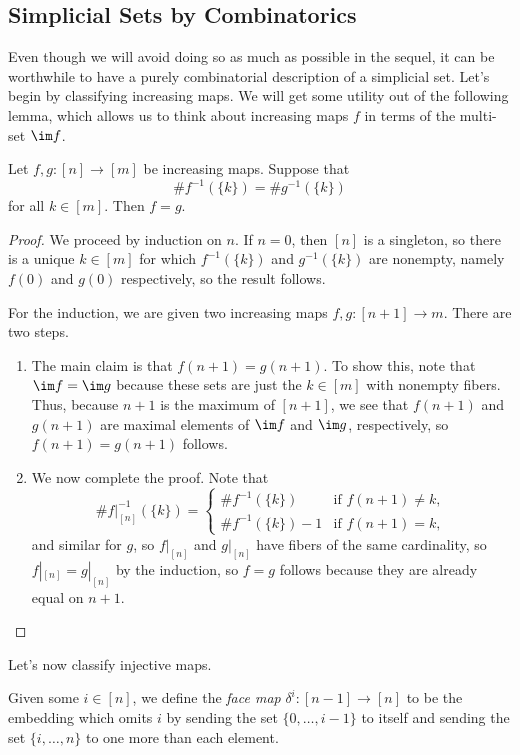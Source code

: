 \documentclass[../notes.tex]{subfiles}
\begin{document}
\subsection{Simplicial Sets by Combinatorics}
Even though we will avoid doing so as much as possible in the sequel, it can be worthwhile to have a purely combinatorial description of a simplicial set. Let's begin by classifying increasing maps. We will get some utility out of the following lemma, which allows us to think about increasing maps $f$ in terms of the multi-set $\im f$.
\begin{lemma} \label{lem:inc-by-fibers}
	Let $f,g\colon[n]\to[m]$ be increasing maps. Suppose that
	\[\#f^{-1}(\{k\})=\#g^{-1}(\{k\})\]
	for all $k\in[m]$. Then $f=g$.
\end{lemma}
\begin{proof}
	We proceed by induction on $n$. If $n=0$, then $[n]$ is a singleton, so there is a unique $k\in[m]$ for which $f^{-1}(\{k\})$ and $g^{-1}(\{k\})$ are nonempty, namely $f(0)$ and $g(0)$ respectively, so the result follows.

	For the induction, we are given two increasing maps $f,g\colon[n+1]\to m$. There are two steps.
	\begin{enumerate}
		\item The main claim is that $f(n+1)=g(n+1)$. To show this, note that $\im f=\im g$ because these sets are just the $k\in[m]$ with nonempty fibers. Thus, because $n+1$ is the maximum of $[n+1]$, we see that $f(n+1)$ and $g(n+1)$ are maximal elements of $\im f$ and $\im g$, respectively, so $f(n+1)=g(n+1)$ follows.
		\item We now complete the proof. Note that
		\[\#f|_{[n]}^{-1}(\{k\})=\begin{cases}
			\#f^{-1}(\{k\}) & \text{if }f(n+1)\ne k, \\
			\#f^{-1}(\{k\})-1 & \text{if }f(n+1)=k,
		\end{cases}\]
		and similar for $g$, so $f|_{[n]}$ and $g|_{[n]}$ have fibers of the same cardinality, so $f|_{[n]}=g|_{[n]}$ by the induction, so $f=g$ follows because they are already equal on $n+1$.
		\qedhere
	\end{enumerate}
\end{proof}
Let's now classify injective maps.
\begin{definition}
	Given some $i\in[n]$, we define the \textit{face map} $\delta^i\colon[n-1]\to[n]$ to be the embedding which omits $i$ by sending the set $\{0,\ldots,i-1\}$ to itself and sending the set $\{i,\ldots,n\}$ to one more than each element.
\end{definition}
\end{document}
